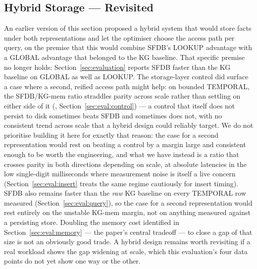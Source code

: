 \subsection{Hybrid Storage --- Revisited}
\label{sec:future:hybrid}

An earlier version of this section proposed a hybrid system that would
store facts under both representations and let the optimiser choose the
access path per query, on the premise that this would combine SFDB's
LOOKUP advantage with a GLOBAL advantage that belonged to the KG baseline.
That specific premise no longer holds: Section~\ref{sec:evaluation} reports SFDB
faster than the KG baseline on GLOBAL as well as LOOKUP. The storage-layer
control did surface a case where a second, reified access path might
help: on
bounded TEMPORAL, the SFDB/KG-mem ratio straddles parity across scale
rather than settling on either side of it (\rangetemporalkgmem{},
Section~\ref{sec:eval:control}) --- a control that itself does not
persist to disk sometimes beats SFDB and sometimes does not, with no
consistent trend across scale that a hybrid design could reliably
target. We do not prioritise building it here for exactly that reason:
the case for a second representation would rest on beating a control
by a margin large and consistent enough to be worth the engineering,
and what we have instead is a ratio that crosses parity in both
directions depending on scale, at absolute latencies in the low
single-digit milliseconds where measurement noise is itself a live
concern (Section~\ref{sec:eval:insert} treats the same regime cautiously
for insert timing).
SFDB also remains faster than the
\emph{raw} KG baseline on every TEMPORAL row measured
(Section~\ref{sec:eval:query}), so the case for a second representation
would rest entirely on the unstable KG-mem margin, not on anything
measured against a persisting store. Doubling the memory cost
identified in Section~\ref{sec:eval:memory} --- the paper's central
tradeoff --- to close a gap of that size is not an obviously good trade. A
hybrid design remains worth revisiting if a real workload shows the gap
widening at scale, which this evaluation's four data points do not yet
show one way or the other.
